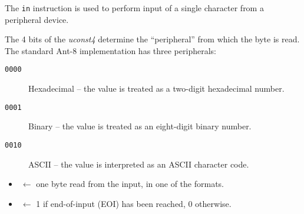 



The {\tt in} instruction is used to perform input
of a single character from a peripheral device.

The 4 bits of the {\em uconst4} determine the ``peripheral'' from which
the byte is read.  The standard Ant-8 implementation has three
peripherals:

\begin{description}

\item[{\tt 0000}] Hexadecimal --
	the value is treated as a two-digit hexadecimal number.

\item[{\tt 0001}] Binary --
	the value is treated as an eight-digit binary number.

\item[{\tt 0010}] {\sc ASCII} --
	the value is interpreted as an ASCII character code.

\end{description}

\begin{itemize}

\item {} $~ \leftarrow$ one byte read from the input, in one of
	the formats.

\item {} $~ \leftarrow$ 1 if end-of-input (EOI) has been reached,
	0 otherwise.

\end{itemize}

